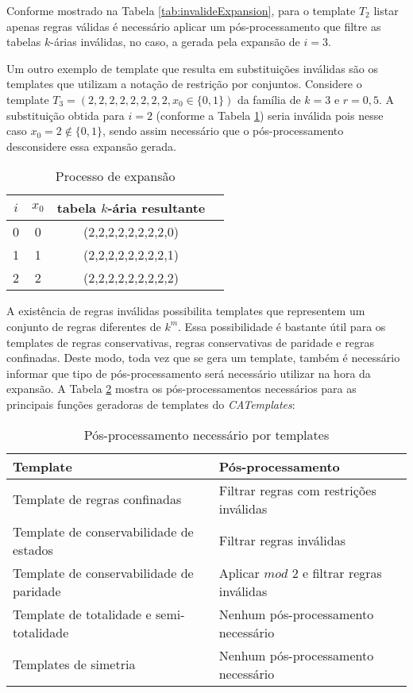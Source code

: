 Conforme mostrado na Tabela \ref{tab:invalideExpansion}, para o template $T_2$ listar apenas regras válidas é necessário aplicar um pós-processamento que filtre as tabelas $k$-árias inválidas, no caso, a gerada pela expansão de $i = 3$. 

Um outro exemplo de template que resulta em substituições inválidas são os templates que utilizam a notação de restrição por conjuntos. Considere o template $T_3 = (2,2,2,2,2,2,2,2,x_0\in \{0,1\})$ da família de $k=3$ e $r=0{,}5$. %
A substituição obtida para $i = 2$ (conforme a Tabela \ref{tab:invalideExpansion2}) seria inválida pois nesse caso $x_0 = 2 \notin \{0,1\}$, sendo assim necessário que o pós-processamento desconsidere essa expansão gerada.
\begin{table}[h!]
\centering
\caption{Processo de expansão}
	\begin{tabular}{cccc}
    \toprule
	$i$ & $x_0$ & tabela $k$-ária resultante \\
    \midrule
	0	&	0	&	(2,2,2,2,2,2,2,2,0)	\\
	1	&	1	&	(2,2,2,2,2,2,2,2,1)	\\
	2	&	2	&	(2,2,2,2,2,2,2,2,2)	\\
    \bottomrule
	\end{tabular}
\label{tab:invalideExpansion2}
\end{table}

A existência de regras inválidas possibilita templates que representem um conjunto de regras diferentes de $k^m$. Essa possibilidade é bastante útil para os templates de regras conservativas, regras conservativas de paridade e regras confinadas. Deste modo, toda vez que se gera um template, também é necessário informar que tipo de pós-processamento será necessário utilizar na hora da expansão. A Tabela \ref{tab:posProcessamento} mostra os pós-processamentos necessários para as principais funções geradoras de templates do \textit{CATemplates}:
\begin{table}[h!]
\centering
\caption{Pós-processamento necessário por templates}
	\begin{tabular}{ll}
    \toprule
	Template & Pós-processamento \\
    \midrule
	Template de regras confinadas 				& Filtrar regras com restrições inválidas	\\
	Template de conservabilidade de estados		& Filtrar regras inválidas						\\
	Template de conservabilidade de paridade 	& Aplicar $mod$ $2$ e filtrar regras inválidas	\\
	Template de totalidade e semi-totalidade 	& Nenhum pós-processamento necessário 				\\
	Templates de simetria		 				& Nenhum pós-processamento necessário 				\\
    \bottomrule
	\end{tabular}
\label{tab:posProcessamento}
\end{table}

